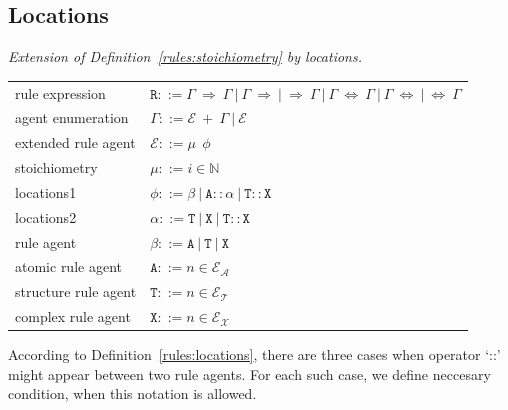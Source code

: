 \documentclass[12pt]{fithesis2}
\begin{document}
\subsection{Locations}

\begin{definition}\label{rules:locations}
\emph{Extension of Definition~\ref{rules:stoichiometry} by locations.}

\begin{center}
{\small
\hspace*{-1cm}\begin{tabular}{ l l }
 rule expression & $\mathtt{R} ::= \Gamma ~\Rightarrow~ \Gamma ~|~ \Gamma ~\Rightarrow ~|~ \Rightarrow~ \Gamma ~|~ \Gamma ~\Leftrightarrow~ \Gamma ~|~ \Gamma ~\Leftrightarrow ~|~ \Leftrightarrow~ \Gamma $\\
 agent enumeration & $\Gamma ::= \mathcal{E}~ +~\Gamma ~|~ \mathcal{E}$\\
 extended rule agent & $\mathcal{E} ::= \mu ~~ \phi$\\
 stoichiometry & $\mu ::= i \in \mathbb{N}$\\
 locations1 & $\phi ::= \beta ~|~ \mathtt{A} :: \alpha ~|~ \mathtt{T}::\mathtt{X}$\\
 locations2 & $\alpha ::= \mathtt{T} ~|~ \mathtt{X} ~|~ \mathtt{T} :: \mathtt{X}$\\
 rule agent & $\beta ::= \mathtt{A} ~|~ \mathtt{T} ~|~ \mathtt{X}$\\
 atomic rule agent & $\mathtt{A} ::= n \in \mathcal{E}_\mathcal{A}$\\
 structure rule agent & $\mathtt{T} ::= n \in \mathcal{E}_\mathcal{T}$\\
 complex rule agent & $\mathtt{X} ::= n \in \mathcal{E}_\mathcal{X}$\\
\end{tabular}
}
\end{center}
\end{definition}

According to Definition~\ref{rules:locations}, there are three cases when operator `::' might appear between two rule agents. For each such case, we define neccesary condition, when this notation is allowed.
\end{document}
